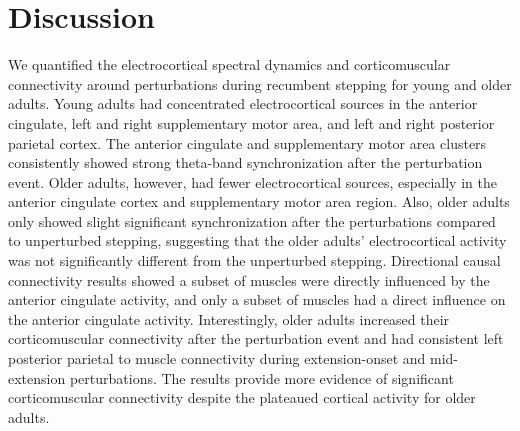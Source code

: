 \documentclass[../thesis_seyed.tex]{subfiles}
\begin{document}
\section{Discussion}
We quantified the electrocortical spectral dynamics and corticomuscular connectivity around perturbations during recumbent stepping for young and older adults. Young adults had concentrated electrocortical sources in the anterior cingulate, left and right supplementary motor area, and left and right posterior parietal cortex. The anterior cingulate and supplementary motor area clusters consistently showed strong theta-band synchronization after the perturbation event. Older adults, however, had fewer electrocortical sources, especially in the anterior cingulate cortex and supplementary motor area region. Also, older adults only showed slight significant synchronization after the perturbations compared to unperturbed stepping, suggesting that the older adults’ electrocortical activity was not significantly different from the unperturbed stepping. Directional causal connectivity results showed a subset of muscles were directly influenced by the anterior cingulate activity, and only a subset of muscles  had a direct influence on the anterior cingulate activity. Interestingly, older adults increased their corticomuscular connectivity after the perturbation event and had consistent left posterior parietal to muscle connectivity during extension-onset and mid-extension perturbations. The results  provide more evidence of significant corticomuscular connectivity despite the plateaued cortical activity for older adults.
\end{document}
